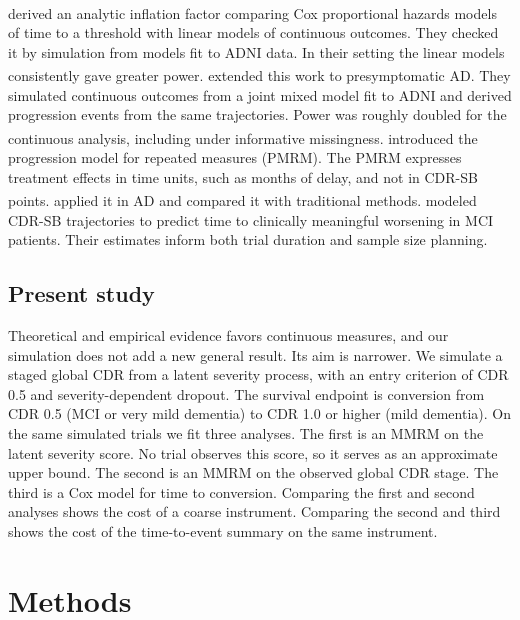 \documentclass[
  11pt,
]{article}
\begin{document}
\textsuperscript{} derived an analytic inflation factor
comparing Cox proportional hazards models of time to a
threshold with linear models of continuous outcomes. They
checked it by simulation from models fit to ADNI data. In
their setting the linear models consistently gave greater
power.\textsuperscript{} extended this work to
presymptomatic AD. They simulated continuous outcomes from
a joint mixed model fit to ADNI and derived progression
events from the same trajectories. Power was roughly
doubled for the continuous analysis, including under
informative missingness.\textsuperscript{} introduced the
progression model for repeated measures (PMRM). The PMRM
expresses treatment effects in time units, such as months
of delay, and not in CDR-SB points.\textsuperscript{} applied it in AD and compared it
with traditional methods.\textsuperscript{} modeled
CDR-SB trajectories to predict time to clinically
meaningful worsening in MCI patients. Their estimates
inform both trial duration and sample size planning.

\subsection{Present study}\label{present-study}

Theoretical and empirical evidence favors continuous
measures, and our simulation does not add a new general
result. Its aim is narrower. We simulate a staged global
CDR from a latent severity process, with an entry
criterion of CDR 0.5 and severity-dependent dropout. The
survival endpoint is conversion from CDR 0.5 (MCI or very
mild dementia) to CDR 1.0 or higher (mild dementia). On
the same simulated trials we fit three analyses. The
first is an MMRM on the latent severity score. No trial
observes this score, so it serves as an approximate upper
bound. The
second is an MMRM on the observed global CDR stage. The
third is a Cox model for time to conversion. Comparing the
first and second analyses shows the cost of a coarse
instrument. Comparing the second and third shows the cost
of the time-to-event summary on the same instrument.

\section{Methods}\label{methods}
\end{document}
